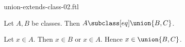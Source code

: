 \documentclass{article}
\begin{document}
\begin{smodule}[creators={Marcel Schütz}]{union-extends-class-02.ftl}

  \begin{fproposition*}[label=8894188219269120]
    Let $A, B$ be classes.
    Then $A \subclass[eq] \union{B,C}$.
  \end{fproposition*}
  \begin{fproof}
    Let $x \in A$.
    Then $x \in B$ or $x \in A$.
    Hence $x \in \union{B,C}$.
  \end{fproof}
\end{smodule}
\end{document}
